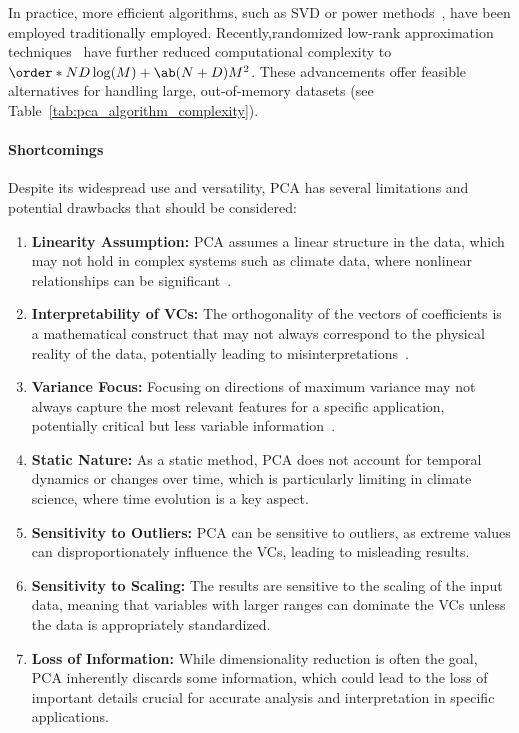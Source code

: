 In practice, more efficient algorithms, such as SVD or power methods~\cite{golub_matrix_2013}, have been employed traditionally employed. Recently,randomized low-rank approximation techniques~\cite{drineas_clustering_2004,halko_finding_2011} have further reduced computational complexity to $\order*{ND \log(M) + \ab(N+D)M^2}$. These advancements offer feasible alternatives for handling large, out-of-memory datasets (see Table~\ref{tab:pca_algorithm_complexity}).

\paragraph{Shortcomings} 

Despite its widespread use and versatility, PCA has several limitations and potential drawbacks that should be considered:

\begin{enumerate}
    \item \textbf{Linearity Assumption:} PCA assumes a linear structure in the data, which may not hold in complex systems such as climate data, where nonlinear relationships can be significant~\cite{scholkopf_nonlinear_1998}.
    \item \textbf{Interpretability of VCs:} The orthogonality of the vectors of coefficients is a mathematical construct that may not always correspond to the physical reality of the data, potentially leading to misinterpretations~\cite{richman_rotation_1986}.
    \item \textbf{Variance Focus:} Focusing on directions of maximum variance may not always capture the most relevant features for a specific application, potentially critical but less variable information~\cite{farrell_accurate_2001}.
    \item \textbf{Static Nature:} As a static method, PCA does not account for temporal dynamics or changes over time, which is particularly limiting in climate science, where time evolution is a key aspect.
    \item \textbf{Sensitivity to Outliers:} PCA can be sensitive to outliers, as extreme values can disproportionately influence the VCs, leading to misleading results.
    \item \textbf{Sensitivity to Scaling:} The results are sensitive to the scaling of the input data, meaning that variables with larger ranges can dominate the VCs unless the data is appropriately standardized.
    \item \textbf{Loss of Information:} While dimensionality reduction is often the goal, PCA inherently discards some information, which could lead to the loss of important details crucial for accurate analysis and interpretation in specific applications.
\end{enumerate}

